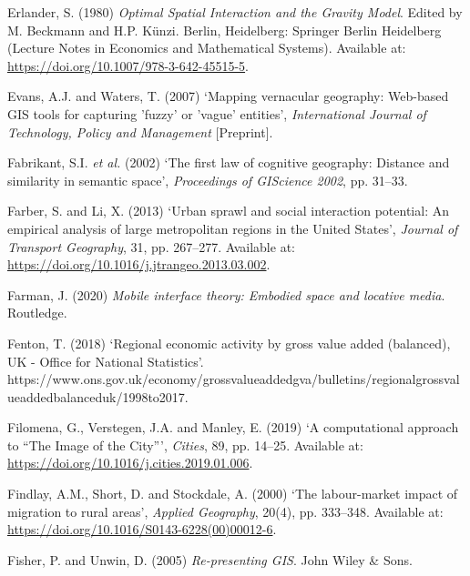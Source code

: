 \documentclass[
  letterpaper,
  11pt,
  english,
  onehalfspacing,
  headsepline]{MastersDoctoralThesis}
\newlength{\cslhangindent}
\newlength{\cslentryspacingunit} %
\newenvironment{CSLReferences}[2] %
 {%
  \setlength{\parindent}{0pt}
  \ifodd #1
  \let\oldpar\par
  \def\par{\hangindent=\cslhangindent\oldpar}
  \fi
  \setlength{\parskip}{#2\cslentryspacingunit}
 }%
 {}
\begin{document}
\begin{CSLReferences}{0}{0}
\leavevmode{}%
Erlander, S. (1980) \emph{Optimal {Spatial Interaction} and the {Gravity
Model}}. Edited by M. Beckmann and H.P. Künzi. {Berlin, Heidelberg}:
{Springer Berlin Heidelberg} (Lecture {Notes} in {Economics} and
{Mathematical Systems}). Available at:
\url{https://doi.org/10.1007/978-3-642-45515-5}.

\leavevmode{}%
Evans, A.J. and Waters, T. (2007) {`Mapping vernacular geography:
Web-based {GIS} tools for capturing 'fuzzy' or 'vague' entities'},
\emph{International Journal of Technology, Policy and Management}
{[}Preprint{]}.

\leavevmode{}%
Fabrikant, S.I. \emph{et al.} (2002) {`The first law of cognitive
geography: {Distance} and similarity in semantic space'},
\emph{Proceedings of GIScience 2002}, pp. 31--33.

\leavevmode{}%
Farber, S. and Li, X. (2013) {`Urban sprawl and social interaction
potential: An empirical analysis of large metropolitan regions in the
{United States}'}, \emph{Journal of Transport Geography}, 31, pp.
267--277. Available at:
\url{https://doi.org/10.1016/j.jtrangeo.2013.03.002}.

\leavevmode{}%
Farman, J. (2020) \emph{Mobile interface theory: {Embodied} space and
locative media}. {Routledge}.

\leavevmode{}%
Fenton, T. (2018) {`Regional economic activity by gross value added
(balanced), {UK} - {Office} for {National Statistics}'}.
https://www.ons.gov.uk/economy/grossvalueaddedgva/bulletins/regionalgrossvalueaddedbalanceduk/1998to2017.

\leavevmode{}%
Filomena, G., Verstegen, J.A. and Manley, E. (2019) {`A computational
approach to {``{The Image} of the {City}''}'}, \emph{Cities}, 89, pp.
14--25. Available at:
\url{https://doi.org/10.1016/j.cities.2019.01.006}.

\leavevmode{}%
Findlay, A.M., Short, D. and Stockdale, A. (2000) {`The labour-market
impact of migration to rural areas'}, \emph{Applied Geography}, 20(4),
pp. 333--348. Available at:
\url{https://doi.org/10.1016/S0143-6228(00)00012-6}.

\leavevmode{}%
Fisher, P. and Unwin, D. (2005) \emph{Re-presenting {GIS}}. {John Wiley
\& Sons}.


\end{CSLReferences}
\end{document}
